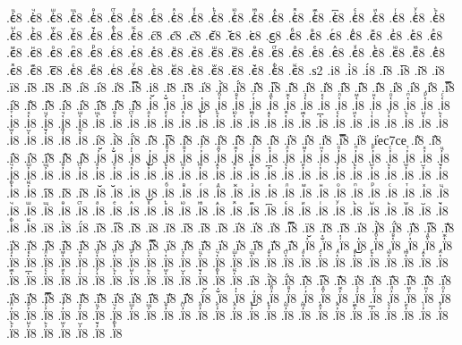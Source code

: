 {.є҆ⷰ8
.є҆ⷱ8
.є҆ⷲ8
.є҆ⷳ8
.є҆ⷴ8
.є҆ⷵ8
.є҆ⷶ8
.є҆ⷷ8
.є҆ⷸ8
.є҆ⷹ8
.є҆ⷺ8
.є҆ⷻ8
.є҆ⷼ8
.є҆ⷽ8
.є҆ⷾ8
.є҆ⷿ8
.є҆꙯8
.є҆ꙴ8
.є҆ꙵ8
.є҆ꙶ8
.є҆ꙷ8
.є҆ꙸ8
.є҆ꙹ8
.є҆ꙺ8
.є҆ꙻ8
.є҆꙼8
.є҆꙽8
.є҆ꚞ8
.є҆ꚟ8
.є҇8
.є᷀8
.є᷁8
.є᷶8
.є᷷8
.є᷸8
.є᷹8
.єⷠ8
.єⷡ8
.єⷢ8
.єⷣ8
.єⷤ8
.єⷥ8
.єⷦ8
.єⷧ8
.єⷨ8
.єⷩ8
.єⷪ8
.єⷫ8
.єⷬ8
.єⷭ8
.єⷮ8
.єⷯ8
.єⷰ8
.єⷱ8
.єⷲ8
.єⷳ8
.єⷴ8
.єⷵ8
.єⷶ8
.єⷷ8
.єⷸ8
.єⷹ8
.єⷺ8
.єⷻ8
.єⷼ8
.єⷽ8
.єⷾ8
.єⷿ8
.є꙯8
.єꙴ8
.єꙵ8
.єꙶ8
.єꙷ8
.єꙸ8
.єꙹ8
.єꙺ8
.єꙻ8
.є꙼8
.є꙽8
.єꚞ8
.єꚟ8
.ѕ2
.і8
.і̀8
.і́8
.і̂8
.і̅8
.і̆8
.і̇8
.ї8
.і̋8
.і̏8
.і̑8
.і̓8
.і̔8
.і̾8
.і̿8
.і͘8
.і҃8
.і҄8
.і҅8
.і҅̀8
.і҅́8
.і҅̂8
.і҅̅8
.і҅̆8
.і҅̇8
.і҅̈8
.і҅̋8
.і҅̏8
.і҅̑8
.і҅̓8
.і҅̔8
.і҅̾8
.і҅̿8
.і҅͘8
.і҅҃8
.і҅҄8
.і҅҅8
.і҅҆8
.і҅҇8
.і҅᷀8
.і҅᷁8
.і҅᷶8
.і᷷҅8
.і᷸҅8
.і᷹҅8
.і҅ⷠ8
.і҅ⷡ8
.і҅ⷢ8
.і҅ⷣ8
.і҅ⷤ8
.і҅ⷥ8
.і҅ⷦ8
.і҅ⷧ8
.і҅ⷨ8
.і҅ⷩ8
.і҅ⷪ8
.і҅ⷫ8
.і҅ⷬ8
.і҅ⷭ8
.і҅ⷮ8
.і҅ⷯ8
.і҅ⷰ8
.і҅ⷱ8
.і҅ⷲ8
.і҅ⷳ8
.і҅ⷴ8
.і҅ⷵ8
.і҅ⷶ8
.і҅ⷷ8
.і҅ⷸ8
.і҅ⷹ8
.і҅ⷺ8
.і҅ⷻ8
.і҅ⷼ8
.і҅ⷽ8
.і҅ⷾ8
.і҅ⷿ8
.і҅꙯8
.і҅ꙴ8
.і҅ꙵ8
.і҅ꙶ8
.і҅ꙷ8
.і҅ꙸ8
.і҅ꙹ8
.і҅ꙺ8
.і҅ꙻ8
.і҅꙼8
.і҅꙽8
.і҅ꚞ8
.і҅ꚟ8
.і҆8
.і҆̀8
.і҆́8
.і҆̂8
.і҆̅8
.і҆̆8
.і҆̇8
.і҆̈8
.і҆̋8
.і҆̏8
.і҆̑8
.і҆̓8
.і҆̔8
.і҆̾8
.і҆̿8
.і҆͘8
.і҆ес7се
.і҆҃8
.і҆҄8
.і҆҅8
.і҆҆8
.і҆҇8
.і҆᷀8
.і҆᷁8
.і҆᷶8
.і᷷҆8
.і᷸҆8
.і᷹҆8
.і҆ⷠ8
.і҆ⷡ8
.і҆ⷢ8
.і҆ⷣ8
.і҆ⷤ8
.і҆ⷥ8
.і҆ⷦ8
.і҆ⷧ8
.і҆ⷨ8
.і҆ⷩ8
.і҆ⷪ8
.і҆ⷫ8
.і҆ⷬ8
.і҆ⷭ8
.і҆ⷮ8
.і҆ⷯ8
.і҆ⷰ8
.і҆ⷱ8
.і҆ⷲ8
.і҆ⷳ8
.і҆ⷴ8
.і҆ⷵ8
.і҆ⷶ8
.і҆ⷷ8
.і҆ⷸ8
.і҆ⷹ8
.і҆ⷺ8
.і҆ⷻ8
.і҆ⷼ8
.і҆ⷽ8
.і҆ⷾ8
.і҆ⷿ8
.і҆꙯8
.і҆ꙴ8
.і҆ꙵ8
.і҆ꙶ8
.і҆ꙷ8
.і҆ꙸ8
.і҆ꙹ8
.і҆ꙺ8
.і҆ꙻ8
.і҆꙼8
.і҆꙽8
.і҆ꚞ8
.і҆ꚟ8
.і҇8
.і᷀8
.і᷁8
.і᷶8
.і᷷8
.і᷸8
.і᷹8
.іⷠ8
.іⷡ8
.іⷢ8
.іⷣ8
.іⷤ8
.іⷥ8
.іⷦ8
.іⷧ8
.іⷨ8
.іⷩ8
.іⷪ8
.іⷫ8
.іⷬ8
.іⷭ8
.іⷮ8
.іⷯ8
.іⷰ8
.іⷱ8
.іⷲ8
.іⷳ8
.іⷴ8
.іⷵ8
.іⷶ8
.іⷷ8
.іⷸ8
.іⷹ8
.іⷺ8
.іⷻ8
.іⷼ8
.іⷽ8
.іⷾ8
.іⷿ8
.і꙯8
.іꙴ8
.іꙵ8
.іꙶ8
.іꙷ8
.іꙸ8
.іꙹ8
.іꙺ8
.іꙻ8
.і꙼8
.і꙽8
.іꚞ8
.іꚟ8
.ї8
.ї̀8
.ї́8
.ї̂8
.ї̅8
.ї̆8
.ї̇8
.ї̈8
.ї̋8
.ї̏8
.ї̑8
.ї̓8
.ї̔8
.ї̾8
.ї̿8
.ї͘8
.ї҃8
.ї҄8
.ї҅8
.ї҅̀8
.ї҅́8
.ї҅̂8
.ї҅̅8
.ї҅̆8
.ї҅̇8
.ї҅̈8
.ї҅̋8
.ї҅̏8
.ї҅̑8
.ї҅̓8
.ї҅̔8
.ї҅̾8
.ї҅̿8
.ї҅͘8
.ї҅҃8
.ї҅҄8
.ї҅҅8
.ї҅҆8
.ї҅҇8
.ї҅᷀8
.ї҅᷁8
.ї҅᷶8
.ї᷷҅8
.ї᷸҅8
.ї᷹҅8
.ї҅ⷠ8
.ї҅ⷡ8
.ї҅ⷢ8
.ї҅ⷣ8
.ї҅ⷤ8
.ї҅ⷥ8
.ї҅ⷦ8
.ї҅ⷧ8
.ї҅ⷨ8
.ї҅ⷩ8
.ї҅ⷪ8
.ї҅ⷫ8
.ї҅ⷬ8
.ї҅ⷭ8
.ї҅ⷮ8
.ї҅ⷯ8
.ї҅ⷰ8
.ї҅ⷱ8
.ї҅ⷲ8
.ї҅ⷳ8
.ї҅ⷴ8
.ї҅ⷵ8
.ї҅ⷶ8
.ї҅ⷷ8
.ї҅ⷸ8
.ї҅ⷹ8
.ї҅ⷺ8
.ї҅ⷻ8
.ї҅ⷼ8
.ї҅ⷽ8
.ї҅ⷾ8
.ї҅ⷿ8
.ї҅꙯8
.ї҅ꙴ8
.ї҅ꙵ8
.ї҅ꙶ8
.ї҅ꙷ8
.ї҅ꙸ8
.ї҅ꙹ8
.ї҅ꙺ8
.ї҅ꙻ8
.ї҅꙼8
.ї҅꙽8
.ї҅ꚞ8
.ї҅ꚟ8
.ї҆8
.ї҆̀8
.ї҆́8
.ї҆̂8
.ї҆̅8
.ї҆̆8
.ї҆̇8
.ї҆̈8
.ї҆̋8
.ї҆̏8
.ї҆̑8
.ї҆̓8
.ї҆̔8
.ї҆̾8
.ї҆̿8
.ї҆͘8
.ї҆҃8
.ї҆҄8
.ї҆҅8
.ї҆҆8
.ї҆҇8
.ї҆᷀8
.ї҆᷁8
.ї҆᷶8
.ї᷷҆8
.ї᷸҆8
.ї᷹҆8
.ї҆ⷠ8
.ї҆ⷡ8
.ї҆ⷢ8
.ї҆ⷣ8
.ї҆ⷤ8
.ї҆ⷥ8
.ї҆ⷦ8
.ї҆ⷧ8
.ї҆ⷨ8
.ї҆ⷩ8
.ї҆ⷪ8
.ї҆ⷫ8
.ї҆ⷬ8
.ї҆ⷭ8
.ї҆ⷮ8
.ї҆ⷯ8
.ї҆ⷰ8
.ї҆ⷱ8
.ї҆ⷲ8
.ї҆ⷳ8
.ї҆ⷴ8
.ї҆ⷵ8
.ї҆ⷶ8
.ї҆ⷷ8
.ї҆ⷸ8
.ї҆ⷹ8
.ї҆ⷺ8
.ї҆ⷻ8
.ї҆ⷼ8
.ї҆ⷽ8
.ї҆ⷾ8
.ї҆ⷿ8
.ї҆꙯8
.ї҆ꙴ8
.ї҆ꙵ8
.ї҆ꙶ8
.ї҆ꙷ8
.ї҆ꙸ8
.ї҆ꙹ8
.ї҆ꙺ8
.ї҆ꙻ8
.ї҆꙼8
.ї҆꙽8
.ї҆ꚞ8
}
